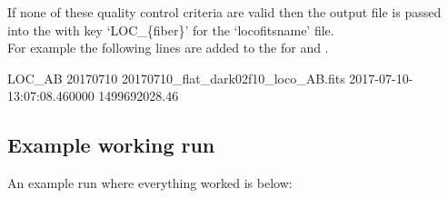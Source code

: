 \noindent If none of these quality control criteria are valid then the output file is passed into the \calibdb with key `LOC\_\{fiber\}' for the `locofitsname' file. \\

\noindent For example the following lines are added to the \calibdb for 
 and . \\

\begin{textbox}[title={In calibration database file}]
LOC_AB 20170710 20170710_flat_dark02f10_loco_AB.fits 2017-07-10-13:07:08.460000 1499692028.46
\end{textbox}


\subsection{Example working run}

An example run where everything worked is below:


